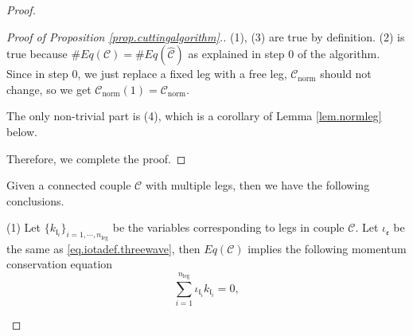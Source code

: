 \begin{proof}
\begin{proof}[Proof of Proposition \ref{prop.cuttingalgorithm}.]

(1), (3) are true by definition. (2) is true because
$\#Eq(\mathcal{C})=\#Eq(\widehat{\mathcal{C}})$ as explained in step $0$ of the algorithm. Since in step $0$, we just replace a fixed leg with a free leg, $\mathcal{C}_{\text{norm}}$ should not change, so we get $\mathcal{C}_{\text{norm}}(1)=\mathcal{C}_{\text{norm}}$. 

The only non-trivial part is (4), which is a corollary of Lemma \ref{lem.normleg} below.

Therefore, we complete the proof.
\end{proof}


\begin{lem}\label{lem.freeleg} %
Given a connected couple $\mathcal{C}$ with multiple legs, then we have the following conclusions.

(1) Let $\{k_{\mathfrak{l}_i}\}_{i=1,\cdots,n_{\text{leg}}}$ be the variables corresponding to legs in couple $\mathcal{C}$. Let $\iota_{\mathfrak{e}}$ be the same as \eqref{eq.iotadef.threewave}, then $Eq(\mathcal{C})$ implies the following momentum conservation equation
\begin{equation}\label{eq.momentumconservation.threewave}
    \sum_{i=1}^{n_{\text{leg}}} \iota_{\mathfrak{l}_i}k_{\mathfrak{l}_i}=0,
\end{equation}


\end{lem}
\end{proof}
